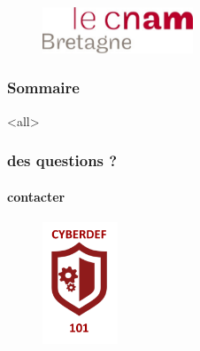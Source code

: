 \institute[\uinstituteshort]{\uinstitute \\ \uchaire}


\date[\uversion]{Date de publication\\ \today}



\begin{frame}[plain]

 					\begin{figure}
  					 \centering
   						 \includegraphics[width=0.4\textwidth]{../Tex/template.inc/Commons/CommonsPictures/cnambretagne.pdf}\\
				  \end{figure}

				  				\titlepage
\end{frame}
\begin{frame}
 \frametitle{Sommaire}
      \begin{multicols}{2}
         \tableofcontents[hideallsubsections]
     \end{multicols}
 \end{frame}


 
\mode<all>{\ubody}



\begin{frame}
 \frametitle{des questions ?}
  \framesubtitle{contacter \umaila}
  					\begin{figure}
  					 \centering
   						 \includegraphics[width=0.2\textwidth]{../Tex/template.inc/Commons/CommonsPictures/cyberdef101.pdf}\\
				  \end{figure}
 \end{frame}

